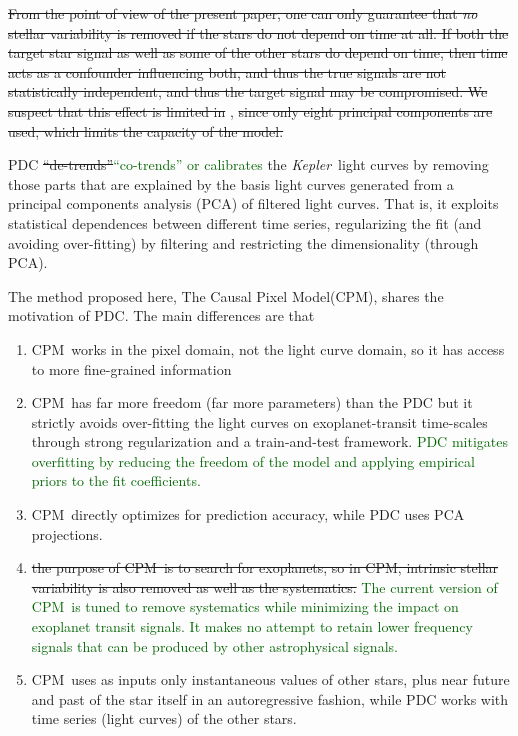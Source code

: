 \documentclass[12pt, preprint]{aastex}
\newcommand{\project}[1]{\textsl{#1}}
\newcommand{\Kepler}{\project{Kepler}}
\newcommand{\name}{CPM}
\newcommand{\revise}[1]{\textcolor{darkgreen}{#1}}
\newcommand{\remove}[1]{\sout{#1}}
\begin{document}
\remove{From the point of view of the present paper, 
one can only guarantee that {\em no} stellar variability is removed if the stars do not depend on time at all.
If both the target star signal as well as some of the other stars do depend on time, 
  then time acts as a confounder influencing both, and thus the true signals are not statistically independent, 
  and thus the target signal may be compromised. 
We suspect that this effect is limited in} \cite{pdc2,pdc3}, 
  \remove{since only eight principal components are used, which limits the capacity of the model.}

PDC \remove{``de-trends''}\revise{``co-trends'' or calibrates} the \Kepler\ light curves by removing those parts that are explained by the basis light curves generated from a principal components analysis (PCA) of filtered light curves.
That is, it exploits statistical dependences between different time series, regularizing the fit (and avoiding over-fitting) 
  by filtering and restricting the dimensionality (through PCA).

The method proposed here, The Causal Pixel Model(\name), shares the motivation of PDC.
The main differences are that
\begin{enumerate}
\item
\name\ works in the pixel domain, not the light curve domain, so it has access to more fine-grained information
\item
\name\ has far more freedom (far more parameters) than the PDC
  but it strictly avoids over-fitting the light curves on exoplanet-transit time-scales
  through strong regularization and a train-and-test framework. 
  \revise{PDC mitigates overfitting by
reducing the freedom of the model and applying empirical priors to the
fit coefficients.}
\item 
\name\ directly optimizes for prediction accuracy, while PDC uses PCA projections.
\item
\remove{the purpose of \name\ is to search for exoplanets, so in \name, intrinsic stellar
  variability is also removed as well as the systematics.}
  \revise{The current version of \name\ is
tuned to remove systematics while minimizing the impact on exoplanet
transit signals. It makes no attempt to retain lower frequency signals
that can be produced by other astrophysical signals.}
\item 
\name\ uses as inputs only instantaneous values of other stars, plus near future and past of the star itself in an autoregressive fashion, while PDC works with time series (light curves) of the other stars.
\end{enumerate}
\end{document}
